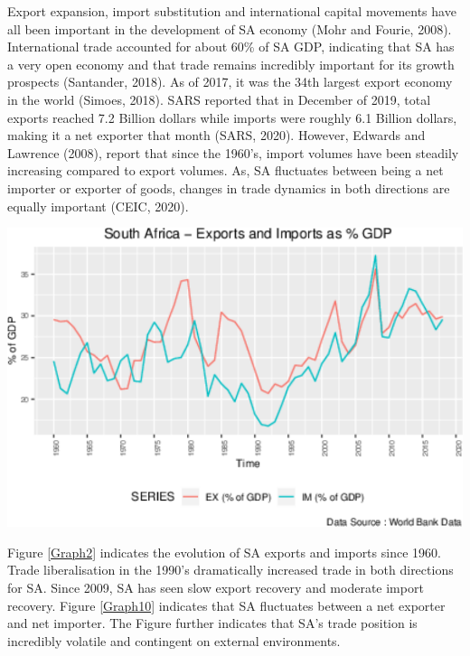 \documentclass[11pt,preprint, authoryear]{elsarticle}
\let\origfigure\figure
\let\endorigfigure\endfigure
\renewenvironment{figure}[1][2] {
    \expandafter\origfigure\expandafter[H]
} {
    \endorigfigure
}
\numberwithin{equation}{section}
\numberwithin{figure}{section}
\numberwithin{table}{section}
\begin{document}
Export expansion, import substitution and international capital
movements have all been important in the development of SA economy (Mohr
and Fourie, 2008). International trade accounted for about 60\% of SA
GDP, indicating that SA has a very open economy and that trade remains
incredibly important for its growth prospects (Santander, 2018). As of
2017, it was the 34th largest export economy in the world (Simoes,
2018). SARS reported that in December of 2019, total exports reached 7.2
Billion dollars while imports were roughly 6.1 Billion dollars, making
it a net exporter that month (SARS, 2020). However, Edwards and Lawrence
(2008), report that since the 1960's, import volumes have been steadily
increasing compared to export volumes. As, SA fluctuates between being a
net importer or exporter of goods, changes in trade dynamics in both
directions are equally important (CEIC, 2020).

\begin{figure}[H]

{\centering \includegraphics{tradedynamics1_files/figure-latex/Graph2-1} 

}

\caption{South Africa Exports and Imports  \label{Graph2}}\label{fig:Graph2}
\end{figure}

Figure \ref{Graph2} indicates the evolution of SA exports and imports
since 1960. Trade liberalisation in the 1990's dramatically increased
trade in both directions for SA. Since 2009, SA has seen slow export
recovery and moderate import recovery. Figure \ref{Graph10} indicates
that SA fluctuates between a net exporter and net importer. The Figure
further indicates that SA's trade position is incredibly volatile and
contingent on external environments.
\end{document}
